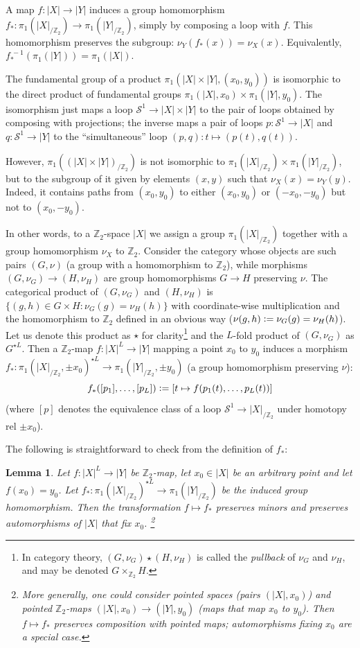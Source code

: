 \documentclass[11pt,a4paper]{scrartcl}
\numberwithin{theorem}{section}
\newtheorem{lemma}[theorem]{Lemma}
\theoremstyle{definition}
\newcommand{\ZZ}{\mathbb{Z}}
\newcommand{\defeq}{\vcentcolon=}
\newcommand\Sphere{\mathcal{S}}
\begin{document}
A map $f\colon |X| \to |Y|$ induces a group homomorphism $f_* \colon \pi_1(|X|_{/\ZZ_2}) \to \pi_1(|Y|_{/\ZZ_2})$, simply by composing a loop with $f$.
This homomorphism preserves the subgroup: $\nu_Y(f_*(x))=\nu_X(x)$.
Equivalently, $f_*^{\ -1}(\pi_1(|Y|))=\pi_1(|X|)$.

The fundamental group of a product $\pi_1(|X|\times|Y|,(x_0,y_0))$ is isomorphic to the direct product of fundamental groups  $\pi_1(|X|,x_0) \times \pi_1(|Y|,y_0)$.
The isomorphism just maps a loop $\Sphere^1 \to |X|\times|Y|$ to the pair of loops obtained by composing with projections; the inverse maps a pair of loops $p \colon \Sphere^1 \to |X|$ and $q \colon \Sphere^1 \to |Y|$ to the ``simultaneous'' loop $(p,q) \colon t \mapsto (p(t),q(t))$.

However, $\pi_1((|X|\times|Y|)_{/\ZZ_2})$ is not isomorphic to $\pi_1(|X|_{/\ZZ_2}) \times \pi_1(|Y|_{/\ZZ_2})$, but to the subgroup of it given by elements $(x,y)$ such that $\nu_X(x)=\nu_Y(y)$.
Indeed, it contains paths from $(x_0,y_0)$ to either $(x_0,y_0)$ or $(-x_0,-y_0)$ but not to $(x_0,-y_0)$.

In other words, to a $\ZZ_2$-space $|X|$ we assign a group $\pi_1(|X|_{/\ZZ_2})$ together with a group homomorphism $\nu_X$ to $\ZZ_2$.
Consider the category whose objects are such pairs $(G,\nu)$ (a group with a homomorphism to $\ZZ_2$),
while morphisms $(G,\nu_G) \to (H,\nu_H)$ are group homomorphisms $G\to H$ preserving $\nu$.
The categorical product of $(G,\nu_G)$ and $(H,\nu_H)$ is $\{(g,h) \in G \times H \colon \nu_G(g)=\nu_H(h)\}$ with coordinate-wise multiplication and the homomorphism to $\ZZ_2$ defined in an obvious way ($\nu(g,h)\defeq\nu_G(g)=\nu_H(h)$).
Let us denote this product as $\star$ for clarity\footnote{In category theory, $(G,\nu_G) \star (H,\nu_H)$ is called the \emph{pullback} of $\nu_G$ and $\nu_H$, and may be denoted $G \times_{\ZZ_2} H$.} and the $L$-fold product of $(G,\nu_G)$ as $G^{\star L}$.
Then a $\ZZ_2$-map $f \colon |X|^L\to|Y|$ mapping a point $x_0$ to $y_0$ induces a morphism $f_* \colon \pi_1(|X|_{/\ZZ_2}, \pm x_0)^{\star L} \to \pi_1(|Y|_{/\ZZ_2}, \pm y_0)$ (a group homomorphism preserving $\nu$):
	$$\textstyle f_*([p_1],\dots,[p_L]) \defeq [t \mapsto f(p_1(t),\dots,p_L(t))]$$
(where $[p]$ denotes the equivalence class of a loop $\Sphere^1 \to |X|_{/\ZZ_2}$ under homotopy rel $\pm x_0$).

The following is straightforward to check from the definition of $f_*$:

\begin{lemma}\label{lem:minionFundGroup}
	Let $f \colon |X|^L\to|Y|$ be $\ZZ_2$-map, let $x_0 \in |X|$ be an arbitrary point and let $f(x_0)=y_0$.
	Let $f_* \colon \pi_1(|X|_{/\ZZ_2})^{\star L} \to \pi_1(|Y|_{/\ZZ_2})$ be the induced group homomorphism.
	Then the transformation $f \mapsto f_*$ preserves minors and preserves automorphisms of $|X|$ that fix $x_0$.%
	\footnote{More generally, one could consider pointed spaces (pairs $(|X|,x_0)$) and pointed $\ZZ_2$-maps $(|X|,x_0) \to (|Y|,y_0)$ (maps that map $x_0$ to $y_0$).
	Then $f \mapsto f_*$ preserves composition with pointed maps; automorphisms fixing $x_0$ are a special case.}
\end{lemma}
\end{document}
